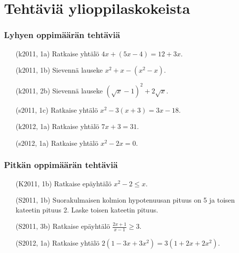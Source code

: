 \section{Tehtäviä ylioppilaskokeista}

\subsubsection*{Lyhyen oppimäärän tehtäviä}

\begin{itemize}
  \item[(k2011, 1a)] Ratkaise yhtälö $4x+(5x-4) = 12+3x$.
  \item[(k2011, 1b)] Sievennä lauseke $x^2+x-(x^2-x)$.
  \item[(k2011, 2b)] Sievennä lauseke $(\sqrt{x}-1)^2+2\sqrt{x}$.
  \item[(s2011, 1c)] Ratkaise yhtälö $x^2-3(x+3) = 3x-18$.
  \item[(k2012, 1a)] Ratkaise yhtälö $7x+3 = 31$.
  \item[(s2012, 1a)] Ratkaise yhtälö $x^2-2x = 0$.
\end{itemize}

\subsubsection*{Pitkän oppimäärän tehtäviä}

\begin{itemize}
  \item[(K2011, 1b)] Ratkaise epäyhtälö $x^2-2 \leq x$.
  \item[(S2011, 1b)] Suorakulmaisen kolmion hypotenuusan pituus on 5
   ja toisen kateetin pituus 2. Laske toisen kateetin pituus.
  \item[(S2011, 3b)] Ratkaise epäyhtälö $\frac{2x+1}{x-1} \geq 3$.
  \item[(S2012, 1a)] Ratkaise yhtälö $2(1-3x+3x^2) = 3(1+2x+2x^2)$.
\end{itemize}




